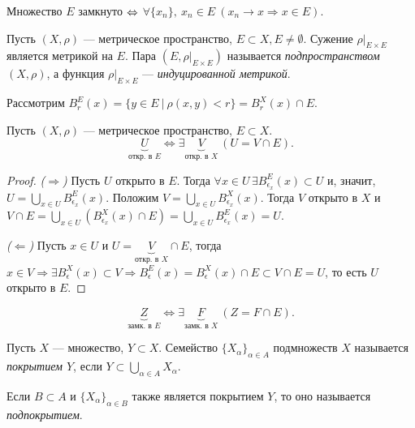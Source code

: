 \begin{corollary}
    Множество $E$ замкнуто $\Leftrightarrow$ $\forall \{x_{n}\}, \ x_{n} \in E \ \left(x_{n} \to x \Rightarrow x \in E\right)$.
\end{corollary}

\begin{definition}
Пусть $(X, \rho)$ --- метрическое пространство, $E \subset X, E \neq \emptyset$. Сужение $\rho\vert_{E \times E}$ является метрикой на $E$. Пара $(E, \rho\vert_{E \times E})$ называется \emph{подпространством} $(X, \rho)$, а функция $\rho\vert_{E \times E}$ --- \emph{индуцированной метрикой}.
\end{definition}

Рассмотрим $B_r^E (x) = \{y \in E \ | \ \rho(x, y) < r\} = B^X_r(x) \cap E$.

\begin{lemma}
    Пусть $(X, \rho)$ --- метрическое пространство, $E \subset X$.
    \[
        \underbrace{U}_{\text{откр. в $E$}} \Leftrightarrow \exists \underbrace{V}_{\text{откр. в $X$}} \ (U = V \cap E).
    \]


    \begin{proof}
        \emph{($\Rightarrow$)} Пусть $U$ открыто в $E$. Тогда $\forall x \in U \, \exists B_{\epsilon_x}^E(x) \subset U$ и, значит, $U = \bigcup_{x \in U} B_{\epsilon_x}^E (x)$. Положим $V = \bigcup_{x \in U} B_{\epsilon_x}^X (x)$. Тогда $V$ открыто в $X$ и $V \cap E = \bigcup_{x \in U} (B_{\epsilon_x}^X(x) \cap E) = \bigcup_{x \in U} B_{\epsilon_x}^E(x) = U$.

        \emph{($\Leftarrow$)} Пусть $x \in U$ и $U = \underbrace{V}_{\text{откр. в $X$}} \cap E$, тогда $x \in V \Rightarrow \exists B_\epsilon^X(x) \subset V \Rightarrow B_\epsilon^E(x) = B_\epsilon^X(x) \cap E \subset V \cap E = U$, то есть $U$ открыто в $E$.
    \end{proof}
\end{lemma}

\begin{corollary}
    \[
        \underbrace{Z}_{\text{замк. в $E$}} \Leftrightarrow \exists \underbrace{F}_{\text{замк. в $X$}} \ (Z = F \cap E).
    \]
\end{corollary}

\begin{definition}
    Пусть $X$ --- множество, $Y \subset X$. Семейство $\{X_\alpha\}_{\alpha \in A}$ подмножеств $X$ называется \emph{покрытием $Y$}, если $Y \subset \bigcup_{\alpha \in A} X_\alpha$.

    Если $B \subset A$ и $\{X_\alpha\}_{\alpha \in B}$ также является покрытием $Y$, то оно называется \emph{подпокрытием}.
\end{definition}

